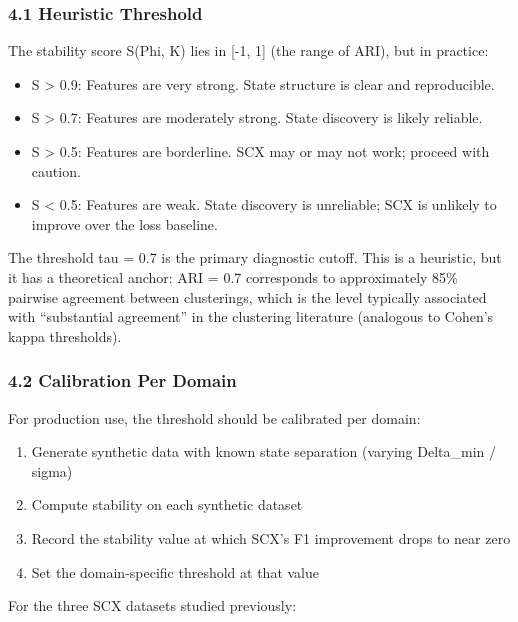 \documentclass[
  12pt,
]{ctexart}
\providecommand{\tightlist}{%
  \setlength{\itemsep}{0pt}\setlength{\parskip}{0pt}}
\begin{document}
\subsubsection{4.1 Heuristic Threshold}\label{heuristic-threshold}

The stability score S(Phi, K) lies in {[}-1, 1{]} (the range of ARI),
but in practice:

\begin{itemize}
\tightlist
\item
  S \textgreater{} 0.9: Features are very strong. State structure is
  clear and reproducible.
\item
  S \textgreater{} 0.7: Features are moderately strong. State discovery
  is likely reliable.
\item
  S \textgreater{} 0.5: Features are borderline. SCX may or may not
  work; proceed with caution.
\item
  S \textless{} 0.5: Features are weak. State discovery is unreliable;
  SCX is unlikely to improve over the loss baseline.
\end{itemize}

The threshold tau = 0.7 is the primary diagnostic cutoff. This is a
heuristic, but it has a theoretical anchor: ARI = 0.7 corresponds to
approximately 85\% pairwise agreement between clusterings, which is the
level typically associated with ``substantial agreement'' in the
clustering literature (analogous to Cohen's kappa thresholds).

\subsubsection{4.2 Calibration Per Domain}\label{calibration-per-domain}

For production use, the threshold should be calibrated per domain:

\begin{enumerate}
\def\labelenumi{\arabic{enumi}.}
\tightlist
\item
  Generate synthetic data with known state separation (varying
  Delta\_min / sigma)
\item
  Compute stability on each synthetic dataset
\item
  Record the stability value at which SCX's F1 improvement drops to near
  zero
\item
  Set the domain-specific threshold at that value
\end{enumerate}

For the three SCX datasets studied previously:
\end{document}
